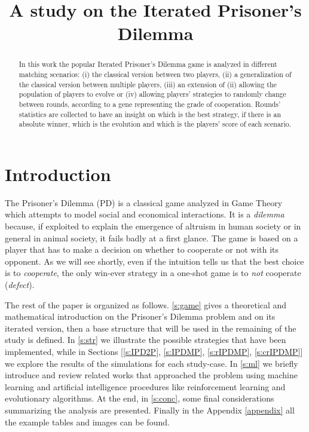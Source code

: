\documentclass[journal,a4paper,10pt,twoside]{IEEEtran} %
\begin{document}
\title{A study on the Iterated Prisoner's Dilemma}

\author{%

}

\maketitle

\begin{abstract}
In this work the popular Iterated Prisoner's Dilemma game is analyzed in different matching scenarios: (i) the classical version between two players, (ii) a generalization of the classical version between multiple players, (iii) an extension of (ii) allowing the population of players to evolve or (iv) allowing players' strategies to randomly change between rounds, according to a gene representing the grade of cooperation. %
Rounds' statistics are collected to have an insight on which is the best strategy, if there is an absolute winner, which is the evolution and which is the players' score of each scenario.
\end{abstract}

\section{Introduction} \label{s:intro}
The Prisoner's Dilemma (PD) is a classical game analyzed in Game Theory which attempts to model social and economical interactions. It is a \textit{dilemma} because, if exploited to explain the emergence of altruism in human society or in general in animal society, it fails badly at a first glance. The game is based on a player that has to make a decision on whether to cooperate or not with its opponent. As we will see shortly, even if the intuition tells us that the best choice is to \textit{cooperate}, the only win-ever strategy in a one-shot game is to \textit{not} cooperate (\textit{defect}).

The rest of the paper is organized as follows.
\autoref{s:game} gives a theoretical and mathematical introduction on the Prisoner's Dilemma problem and on its iterated version, then a base structure that will be used in the remaining of the study is defined.
In \autoref{s:str} we illustrate the possible strategies that have been implemented, while in Sections [\ref{s:IPD2P}, \ref{s:IPDMP}, \ref{s:rIPDMP}, \ref{s:crIPDMP}] we explore the results of the simulations for each study-case.
In \autoref{s:ml} we briefly introduce and review related works that approached the problem using machine learning and artificial intelligence procedures like reinforcement learning and evolutionary algorithms.
At the end, in \autoref{s:conc}, some final considerations summarizing the analysis are presented.
Finally in the Appendix \ref{appendix} all the example tables and images can be found.
\end{document}
